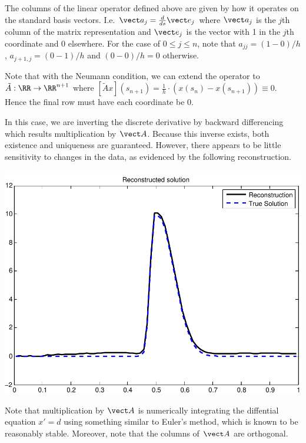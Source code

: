 \documentclass{homework}
\begin{document}
\begin{longproblem}

  \begin{solution}
  The columns of the linear operator defined above are given by how it operates on the standard basis vectors.  I.e. $\vect a_j = \frac d{ds} \vect e_j$ where $\vect a_j$ is the $j$th column of the matrix representation and $\vect e_j$ is the vector with 1 in the $j$th coordinate and 0 elsewhere.  For the case of $0\le j \le n$, note that $a_{jj} = (1 - 0)/h$, $a_{j+1,j} = (0 - 1)/h$ and $(0 - 0)/h = 0$ otherwise.

  Note that with the Neumann condition, we can extend the operator to $\tilde A:\RR \to \RR^{n+1}$ where $[\tilde A x](s_{n+1}) = \frac 1h \cdot (x(s_n) - x(s_{n+1})) \equiv 0$.  Hence the final row must have each coordinate be $0$.
  \end{solution}


  \begin{solution}
  In this case, we are inverting the discrete derivative by backward differencing which results multiplication by $\vect A$.  Because this inverse exists, both existence and uniqueness are guaranteed. However, there appears to be little sensitivity to changes in the data, as evidenced by the following reconstruction.
  \begin{center}
  \includegraphics[width=.4\textwidth]{nonillposed.pdf}
  \end{center}
  
  Note that multiplication by $\vect A$ is numerically integrating the diffential equation $x' = d$ using something similar to Euler's method, which is known to be reasonably stable.  Moreover, note that the columns of $\vect A$ are orthogonal.
  \end{solution}

\end{longproblem}
\end{document}
